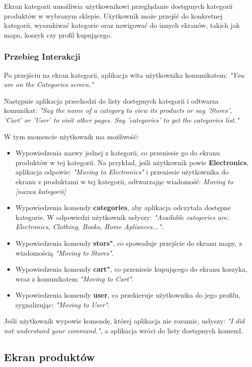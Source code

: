Ekran kategorii umożliwia użytkownikowi przeglądanie dostępnych kategorii produktów w wybranym sklepie. Użytkownik może przejść do konkretnej kategorii, wyszukiwać kategorie oraz nawigować do innych ekranów, takich jak mapa, koszyk czy profil kupującego.

\subsubsection{Przebieg Interakcji}
Po przejściu na ekran kategorii, aplikacja wita użytkownika komunikatem:  
\textit{"You are on the Categories screen."}

Następnie aplikacja przechodzi do listy dostępnych kategorii i odtwarza komunikat:  
\textit{"Say the name of a category to view its products or say 'Stores', 'Cart' or 'User' to visit other pages. Say 'categories' to get the categories list."}

W tym momencie użytkownik ma możliwość:

\begin{itemize}
    \item Wypowiedzenia nazwy jednej z kategorii, co przeniesie go do ekranu produktów w tej kategorii.  
    Na przykład, jeśli użytkownik powie \textbf{Electronics}, aplikacja odpowie:  
    \textit{"Moving to Electronics"} i przeniesie użytkownika do ekranu z produktami w tej kategorii, odtwarzając wiadomość: \textit{Moving to [nazwa kategorii]}
    \item Wypowiedzenia komendy \textbf{categories}, aby aplikacja odczytała dostępne kategorie. W odpowiedzi użytkownik usłyszy: \textit{"Available categories are: Electronics, Clothing, Books, Home Apliances..."}.
    \item Wypowiedzenia komendy \textbf{stors"}, co spowoduje przejście do ekranu mapy, z wiadomością \textit{"Moving to Stores"}.
    \item Wypowiedzenia komendy \textbf{cart"}, co przeniesie kupującego do ekranu koszyka, wraz z komunikatem \textit{"Moving to Cart"}.
    \item Wypowiedzenia komendy \textbf{user}, co przekieruje użytkownika do jego profilu, sygnalizując: \textit{"Moving to User"}.
\end{itemize}

Jeśli użytkownik wypowie komendę, której aplikacja nie rozumie, usłyszy:  
\textit{"I did not understand your command."}, a aplikacja wróci do listy dostępnych komend.

\subsection{Ekran produktów}

